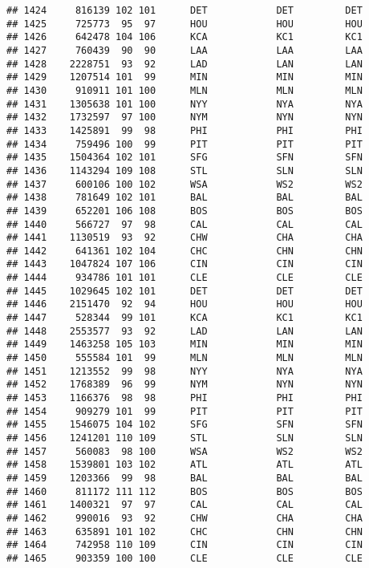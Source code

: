 \documentclass[]{article}
\begin{document}
\begin{verbatim}
## 1424     816139 102 101      DET            DET         DET
## 1425     725773  95  97      HOU            HOU         HOU
## 1426     642478 104 106      KCA            KC1         KC1
## 1427     760439  90  90      LAA            LAA         LAA
## 1428    2228751  93  92      LAD            LAN         LAN
## 1429    1207514 101  99      MIN            MIN         MIN
## 1430     910911 101 100      MLN            MLN         MLN
## 1431    1305638 101 100      NYY            NYA         NYA
## 1432    1732597  97 100      NYM            NYN         NYN
## 1433    1425891  99  98      PHI            PHI         PHI
## 1434     759496 100  99      PIT            PIT         PIT
## 1435    1504364 102 101      SFG            SFN         SFN
## 1436    1143294 109 108      STL            SLN         SLN
## 1437     600106 100 102      WSA            WS2         WS2
## 1438     781649 102 101      BAL            BAL         BAL
## 1439     652201 106 108      BOS            BOS         BOS
## 1440     566727  97  98      CAL            CAL         CAL
## 1441    1130519  93  92      CHW            CHA         CHA
## 1442     641361 102 104      CHC            CHN         CHN
## 1443    1047824 107 106      CIN            CIN         CIN
## 1444     934786 101 101      CLE            CLE         CLE
## 1445    1029645 102 101      DET            DET         DET
## 1446    2151470  92  94      HOU            HOU         HOU
## 1447     528344  99 101      KCA            KC1         KC1
## 1448    2553577  93  92      LAD            LAN         LAN
## 1449    1463258 105 103      MIN            MIN         MIN
## 1450     555584 101  99      MLN            MLN         MLN
## 1451    1213552  99  98      NYY            NYA         NYA
## 1452    1768389  96  99      NYM            NYN         NYN
## 1453    1166376  98  98      PHI            PHI         PHI
## 1454     909279 101  99      PIT            PIT         PIT
## 1455    1546075 104 102      SFG            SFN         SFN
## 1456    1241201 110 109      STL            SLN         SLN
## 1457     560083  98 100      WSA            WS2         WS2
## 1458    1539801 103 102      ATL            ATL         ATL
## 1459    1203366  99  98      BAL            BAL         BAL
## 1460     811172 111 112      BOS            BOS         BOS
## 1461    1400321  97  97      CAL            CAL         CAL
## 1462     990016  93  92      CHW            CHA         CHA
## 1463     635891 101 102      CHC            CHN         CHN
## 1464     742958 110 109      CIN            CIN         CIN
## 1465     903359 100 100      CLE            CLE         CLE

\end{verbatim}
\end{document}
